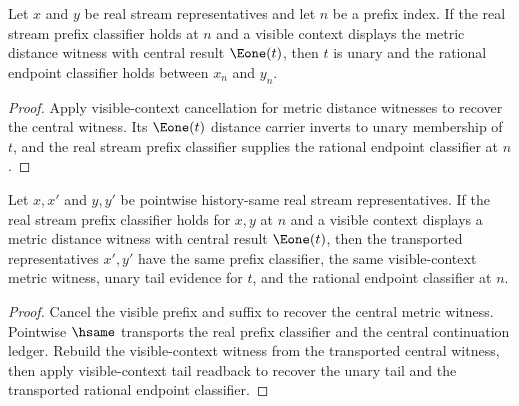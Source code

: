 \begin{theorem}
\label{thm:completion-metric-distance-visible-context-e1-tail-real-prefix-readback}
Let $x$ and $y$ be real stream representatives and let $n$ be a prefix
index. If the real stream prefix classifier holds at $n$ and a visible
context displays the metric distance witness with central result $\Eone(t)$,
then $t$ is unary and the rational endpoint classifier holds between
$x_n$ and $y_n$.
\end{theorem}
\begin{proof}
Apply visible-context cancellation for metric distance witnesses to recover
the central witness. Its $\Eone(t)$ distance carrier inverts to unary
membership of $t$, and the real stream prefix classifier supplies the
rational endpoint classifier at $n$.
\end{proof}

\begin{theorem}
\label{thm:completion-metric-distance-visible-context-e1-tail-hsame-transport}
Let $x,x'$ and $y,y'$ be pointwise history-same real stream representatives.
If the real stream prefix classifier holds for $x,y$ at $n$ and a visible
context displays a metric distance witness with central result $\Eone(t)$,
then the transported representatives $x',y'$ have the same prefix classifier,
the same visible-context metric witness, unary tail evidence for $t$, and the
rational endpoint classifier at $n$.
\end{theorem}
\begin{proof}
Cancel the visible prefix and suffix to recover the central metric witness.
Pointwise $\hsame$ transports the real prefix classifier and the central
continuation ledger. Rebuild the visible-context witness from the transported
central witness, then apply visible-context tail readback to recover the unary
tail and the transported rational endpoint classifier.
\end{proof}

